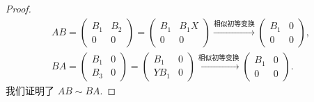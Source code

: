\documentclass[../../main.tex]{subfiles}
\begin{document}
\begin{proof}
\begin{gather*}
AB = \begin{pmatrix} B_1 & B_2 \\ 0 & 0 \end{pmatrix} = \begin{pmatrix} B_1 & B_1X \\ 0 & 0 \end{pmatrix} \xrightarrow{\hyperref[proposition:相似初等变换]{\text{相似初等变换}}} \begin{pmatrix} B_1 & 0 \\ 0 & 0 \end{pmatrix},
\\
BA = \begin{pmatrix} B_1 & 0 \\ B_3 & 0 \end{pmatrix} = \begin{pmatrix} B_1 & 0 \\ YB_1 & 0 \end{pmatrix} \xrightarrow{\hyperref[proposition:相似初等变换]{\text{相似初等变换}}} \begin{pmatrix} B_1 & 0 \\ 0 & 0 \end{pmatrix}.
\end{gather*}
我们证明了 \( AB \sim BA \).
\end{proof}
\end{document}
